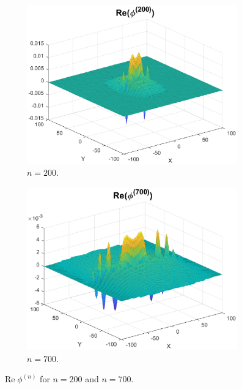 \documentclass[11pt, letter]{book}
\newenvironment{example}
  {\pushQED{\qed}\renewcommand{\qedsymbol}{$\triangle$}\examplex}
  {\popQED\endexamplex}
\renewcommand\Re{\operatorname{Re}}%
\begin{document}
\begin{example}
\begin{figure}[!htb]
    \begin{subfigure}{0.49\textwidth}
    \centering
    \includegraphics[scale=0.58]{Fig10a.eps}
    \caption{$n = 200$.}
    \label{fig:Conv_Pwr_5a}
    \end{subfigure}
    \begin{subfigure}{0.49\textwidth}
    \centering
    \includegraphics[scale=0.58]{Fig10b.eps}
    \caption{$n = 700$.}
    \label{fig:Conv_Pwr_5b}
    \end{subfigure}
    \caption{$\Re{\phi^{(n)}}$ for $n = 200$ and $n=700$.}
    \label{fig:Conv_Pwr_50}
\end{figure}



\end{example}
\end{document}
